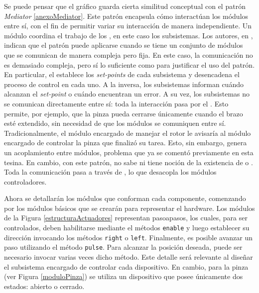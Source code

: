 Se puede pensar que el gráfico guarda cierta similitud conceptual con el patrón \textit{Mediator} \ref{anexoMediator}. Este patrón encapsula cómo interactúan los módulos entre sí, con el fin de permitir variar su interacción de manera independiente. Un módulo \Mediator coordina el trabajo de los \College, en este caso los subsistemas. Los autores, en \cite{Gamma:1995:DPE:186897}, indican que el patrón puede aplicarse cuando se tiene un conjunto de módulos que se comunican de manera compleja pero fija. En este caso, la comunicación no es demasiado compleja, pero sí lo suficiente como para justificar el uso del patrón. En particular, el \MainController establece los \textit{set-points} de cada subsistema y desencadena el proceso de control en cada uno. A la inversa, los subsistemas informan cuándo alcanzan el \textit{set-point} o cuándo encuentran un error. A su vez, los subsistemas no se comunican directamente entre sí: toda la interacción pasa por el \MainController. Esto permite, por ejemplo, que la pinza pueda cerrarse únicamente cuando el brazo esté extendido, sin necesidad de que los módulos se comuniquen entre sí. Tradicionalmente, el módulo encargado de manejar el rotor le avisaría al módulo encargado de controlar la pinza que finalizó su tarea. Esto, sin embargo, genera un acoplamiento entre módulos, problema que ya se comentó previamente en esta tesina. En cambio, con este patrón, \RotorCtrl no sabe ni tiene noción de la existencia de \PinzaCtrl o \ExtensorCtrl. Toda la comunicación pasa a través de \MainController, lo que desacopla los módulos controladores.

Ahora se detallarán los módulos que conforman cada componente, comenzando por los módulos básicos que se crearán para representar el hardware. Los módulos de la Figura \ref{estructuraActuadores} representan \glspl{pasoapaso}, los cuales, para ser controlados, deben habilitarse mediante el métodos \verb|enable| y luego establecer su dirección invocando los métodos \verb|right| o \verb|left|. Finalmente, es posible avanzar un paso utilizando el método \verb|pulse|. Para alcanzar la posición deseada, puede ser necesario invocar varias veces dicho método. Este detalle será relevante al diseñar el subsistema encargado de controlar cada dispositivo. 
En cambio, para la pinza (ver Figura \ref{moduloPinza}) se utiliza un dispositivo que posee únicamente dos estados: abierto o cerrado.

